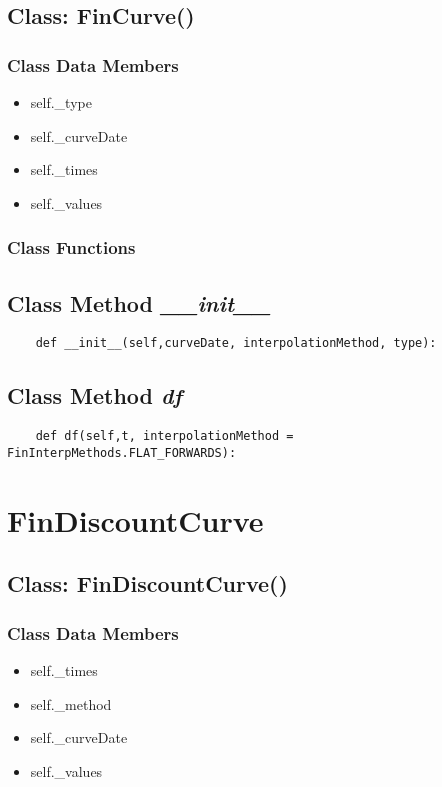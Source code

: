 \documentclass[twoside,11pt]{book}
\begin{document}
\subsection{Class: FinCurve()}


\subsubsection{Class Data Members}
\begin{itemize}
\item{self.\_type}
\item{self.\_curveDate}
\item{self.\_times}
\item{self.\_values}
\end{itemize}

\subsubsection{Class Functions}

\subsection{Class Method {\it \_\_init\_\_}}


\begin{lstlisting}
    def __init__(self,curveDate, interpolationMethod, type):
\end{lstlisting}

\subsection{Class Method {\it df}}


\begin{lstlisting}
    def df(self,t, interpolationMethod = FinInterpMethods.FLAT_FORWARDS):
\end{lstlisting}

\newpage
\section{FinDiscountCurve}

\subsection{Class: FinDiscountCurve()}


\subsubsection{Class Data Members}
\begin{itemize}
\item{self.\_times}
\item{self.\_method}
\item{self.\_curveDate}
\item{self.\_values}
\end{itemize}
\end{document}
